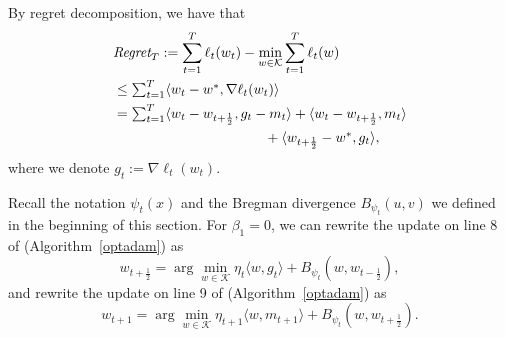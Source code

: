 \documentclass[11pt]{article}
\makeatletter
\def\K{\mathcal{K}}
\renewenvironment{proof}[1][\proofname]{%
   \par\pushQED{\qed}\normalfont%
   \topsep6\p@\@plus6\p@\relax
   \trivlist\item[\hskip\labelsep\bfseries#1]%
   \ignorespaces
}{%
   \popQED\endtrivlist\@endpefalse
}
\theoremstyle{k}
\makeatother
\begin{document}
\begin{proof}
By regret decomposition, we have that
\begin{equation} \label{nn1}
\begin{aligned}
\textstyle
& \text{\it Regret}_T := \sum_{t=1}^T \ell_t(w_t) - \min_{w \in \K} \sum_{t=1}^T \ell_t(w)
\\ & \textstyle  \leq \sum_{t=1}^T  \langle w_t - w^*, \nabla \ell_t(w_t) \rangle
\\ & \textstyle = \sum_{t=1}^T \langle  w_t - w_{t+\frac{1}{2}} , g_t - m_t \rangle
+ \langle w_t - w_{t+\frac{1}{2}}, m_t \rangle\\
&\hspace{1.5in}
 \textstyle + \langle w_{t+\frac{1}{2}} - w^*, g_t  \rangle,
\end{aligned}
\end{equation}
where we denote $g_t:=\nabla \ell_t(w_t)$.


Recall the notation $\psi_t(x)$ and the Bregman divergence $B_{\psi_t}(u,v)$
we defined in the beginning of this section.
For $\beta_1=0$, we can rewrite the update on line 8 of (Algorithm~\ref{optadam}) as
\begin{equation} \label{nc1}
\textstyle w_{t+\frac{1}{2}} = \arg\min_{w \in \K} \eta_t \langle w, g_t \rangle
+ B_{\psi_t}(w, w_{t-\frac{1}{2}} ),
\end{equation}
and rewrite the update on line 9 of (Algorithm~\ref{optadam}) as
\begin{equation} \label{nc2}
\textstyle w_{t+1} = \arg\min_{w \in \K} \eta_{t+1} \langle w, m_{t+1} \rangle
+ B_{\psi_t}(w, w_{t+\frac{1}{2}} ).
\end{equation}



\end{proof}
\end{document}

